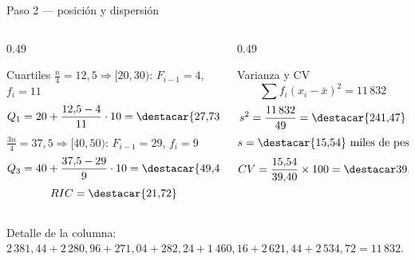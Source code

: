 \documentclass[aspectratio=169,10pt]{beamer}
\begin{document}
\begin{frame}{Paso 2 — posición y dispersión}
  \scriptsize
  \begin{columns}[T,onlytextwidth]
    \begin{column}{0.49\textwidth}
      \begin{block}{Cuartiles}
        \scriptsize
        $\frac{n}{4}=12{,}5 \Rightarrow [20,30)$: $F_{i-1}=4$, $f_i=11$
        \[ Q_1 = 20+\frac{12{,}5-4}{11}\cdot10 = \destacar{27{,}73} \]
        $\frac{3n}{4}=37{,}5 \Rightarrow [40,50)$: $F_{i-1}=29$, $f_i=9$
        \[ Q_3 = 40+\frac{37{,}5-29}{9}\cdot10 = \destacar{49{,}44} \]
        \[ RIC = \destacar{21{,}72} \]
      \end{block}
    \end{column}
    \begin{column}{0.49\textwidth}
      \begin{exampleblock}{Varianza y CV}
        \scriptsize
        \[ \sum f_i(x_i-\bar{x})^2 = 11\,832 \]
        \[ s^2 = \frac{11\,832}{49} = \destacar{241{,}47} \]
        \[ s = \destacar{15{,}54} \text{ miles de pesos} \]
        \[ CV = \frac{15{,}54}{39{,}40}\times100 = \destacar{39{,}4\%} \]
      \end{exampleblock}
    \end{column}
  \end{columns}

  \vspace{0.05cm}
  {\tiny\color{uniGris} Detalle de la columna: $2\,381{,}44 + 2\,280{,}96 +
  271{,}04 + 282{,}24 + 1\,460{,}16 + 2\,621{,}44 + 2\,534{,}72 = 11\,832$.}
\end{frame}
\end{document}
